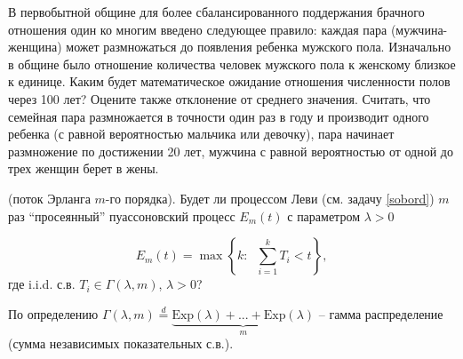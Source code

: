 \begin{problem}
В первобытной общине для более сбалансированного поддержания брачного отношения один ко многим введено следующее правило: каждая пара (мужчина-женщина) может размножаться до появления ребенка мужского пола. Изначально в общине было отношение количества человек мужского пола к женскому близкое к единице. Каким будет математическое ожидание отношения численности полов через 100 лет? Оцените также отклонение от среднего значения. Считать, что семейная пара размножается в точности один раз в году и производит одного ребенка (с равной вероятностью мальчика или девочку), пара начинает размножение по достижении 20 лет, мужчина с равной вероятностью от одной до трех женщин берет в жены.      
\end{problem}

\begin{problem}(поток Эрланга $m$-го порядка).\label{GammaFunc} Будет ли процессом
Леви (см. задачу \ref{sobord}) $m$ раз ``просеянный'' пуассоновский процесс $E_m \left( t \right)$ с 
параметром $\lambda >0$

$$E_m \left( t \right)=\max \left\{ {k:\;\;\sum\limits_{i=1}^k {T_i } <t} 
\right\},$$ 
где i.i.d. с.в. $T_i \in %
\Gamma 
\left( {\lambda ,m} \right)$, $\lambda >0$?
\end{problem}

\begin{remark}
По определению $\Gamma \left( {\lambda ,m} 
\right) \mathop =\limits^d \underbrace {\mbox{Exp}\left( \lambda \right)+...+\mbox{Exp}\left( 
\lambda \right)}_m$ -- гамма распределение (сумма независимых показательных 
с.в.).
\end{remark}

